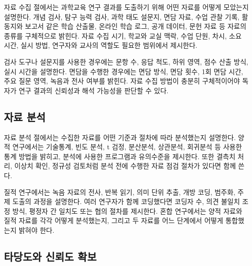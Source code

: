 
자료 수집 절에서는 과학교육 연구 결과를 도출하기 위해 어떤 자료를 어떻게 모았는지 설명한다.
개념 검사, 탐구 능력 검사, 과학 태도 설문지, 면담 자료, 수업 관찰 기록, 활동지와 보고서 같은 학습 산출물, 온라인 학습 로그, 공개 데이터, 문헌 자료 등 자료의 종류를 구체적으로 밝힌다.
자료 수집 시기, 학교와 교실 맥락, 수업 단원, 차시, 소요 시간, 실시 방법, 연구자와 교사의 역할도 필요한 범위에서 제시한다.

검사 도구나 설문지를 사용한 경우에는 문항 수, 응답 척도, 하위 영역, 점수 산출 방식, 실시 시간을 설명한다.
면담을 수행한 경우에는 면담 방식, 면담 횟수, 1회 면담 시간, 주요 질문 영역, 녹음과 전사 여부를 밝힌다.
자료 수집 방법이 충분히 구체적이어야 독자가 연구 결과의 신뢰성과 해석 가능성을 판단할 수 있다.

\subsection{자료 분석}


자료 분석 절에서는 수집한 자료를 어떤 기준과 절차에 따라 분석했는지 설명한다.
양적 연구에서는 기술통계, 빈도 분석, t 검정, 분산분석, 상관분석, 회귀분석 등 사용한 통계 방법을 밝히고, 분석에 사용한 프로그램과 유의수준을 제시한다.
또한 결측치 처리, 이상치 확인, 정규성 검토처럼 분석 전에 수행한 자료 점검 절차가 있다면 함께 쓴다.

질적 연구에서는 녹음 자료의 전사, 반복 읽기, 의미 단위 추출, 개방 코딩, 범주화, 주제 도출의 과정을 설명한다.
여러 연구자가 함께 코딩했다면 코딩자 수, 의견 불일치 조정 방식, 평정자 간 일치도 또는 협의 절차를 제시한다.
혼합 연구에서는 양적 자료와 질적 자료를 각각 어떻게 분석했는지, 그리고 두 자료를 어느 단계에서 어떻게 통합했는지 밝혀야 한다.

\subsection{타당도와 신뢰도 확보}

